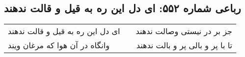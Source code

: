 \begin{center}
\section*{رباعی شماره ۵۵۲: ای دل این ره به قیل و قالت ندهند}
\label{sec:0552}
\begin{longtable}{l p{0.5cm} r}
ای دل این ره به قیل و قالت ندهند
&&
جز بر در نیستی وصالت ندهند
\\
وانگاه در آن هوا که مرغان ویند
&&
تا با پر و بالی پر و بالت ندهند
\\
\end{longtable}
\end{center}
